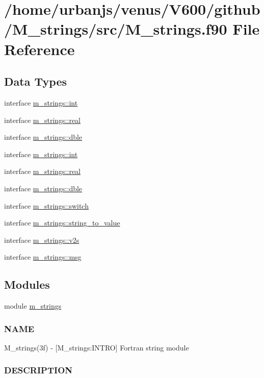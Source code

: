 \hypertarget{M__strings_8f90}{}\section{/home/urbanjs/venus/\+V600/github/\+M\+\_\+strings/src/\+M\+\_\+strings.f90 File Reference}
\label{M__strings_8f90}
\subsection*{Data Types}
\begin{DoxyCompactItemize}
\item 
interface \mbox{\hyperlink{interfacem__strings_1_1int}{m\+\_\+strings\+::int}}
\item 
interface \mbox{\hyperlink{interfacem__strings_1_1real}{m\+\_\+strings\+::real}}
\item 
interface \mbox{\hyperlink{interfacem__strings_1_1dble}{m\+\_\+strings\+::dble}}
\item 
interface \mbox{\hyperlink{interfacem__strings_1_1int}{m\+\_\+strings\+::int}}
\item 
interface \mbox{\hyperlink{interfacem__strings_1_1real}{m\+\_\+strings\+::real}}
\item 
interface \mbox{\hyperlink{interfacem__strings_1_1dble}{m\+\_\+strings\+::dble}}
\item 
interface \mbox{\hyperlink{interfacem__strings_1_1switch}{m\+\_\+strings\+::switch}}
\item 
interface \mbox{\hyperlink{interfacem__strings_1_1string__to__value}{m\+\_\+strings\+::string\+\_\+to\+\_\+value}}
\item 
interface \mbox{\hyperlink{interfacem__strings_1_1v2s}{m\+\_\+strings\+::v2s}}
\item 
interface \mbox{\hyperlink{interfacem__strings_1_1msg}{m\+\_\+strings\+::msg}}
\end{DoxyCompactItemize}
\subsection*{Modules}
\begin{DoxyCompactItemize}
\item 
module \mbox{\hyperlink{namespacem__strings}{m\+\_\+strings}}
\begin{DoxyCompactList}\small\item\em \subsubsection*{N\+A\+ME}

M\+\_\+strings(3f) -\/ \mbox{[}M\+\_\+strings\+:I\+N\+T\+RO\mbox{]} Fortran string module \subsubsection*{D\+E\+S\+C\+R\+I\+P\+T\+I\+ON}\end{DoxyCompactList}\end{DoxyCompactItemize}
